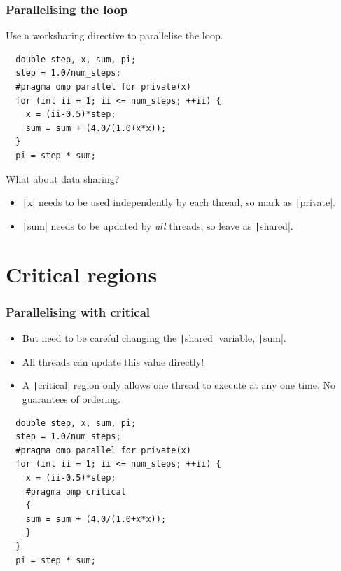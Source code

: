 \documentclass{beamer}
\begin{document}
\begin{frame}[fragile]
\frametitle{Parallelising the loop}

Use a worksharing directive to parallelise the loop.

\begin{verbatim}
  double step, x, sum, pi;
  step = 1.0/num_steps;
  #pragma omp parallel for private(x)
  for (int ii = 1; ii <= num_steps; ++ii) {
    x = (ii-0.5)*step;
    sum = sum + (4.0/(1.0+x*x));
  }
  pi = step * sum;
\end{verbatim}

\vfill

What about data sharing?
\begin{itemize}
  \item \texttt|x| needs to be used independently by each thread, so mark as \texttt|private|.
  \item \texttt|sum| needs to be updated by \emph{all} threads, so leave as \texttt|shared|.
\end{itemize}

\end{frame}

\section{Critical regions}
\begin{frame}[fragile]
\frametitle{Parallelising with critical}
\begin{itemize}
  \item But need to be careful changing the \texttt|shared| variable, \texttt|sum|.
  \item All threads can update this value directly!
  \item A \texttt|critical| region only allows one thread to execute at any one time. No guarantees of ordering.
\end{itemize}

\begin{verbatim}
  double step, x, sum, pi;
  step = 1.0/num_steps;
  #pragma omp parallel for private(x)
  for (int ii = 1; ii <= num_steps; ++ii) {
    x = (ii-0.5)*step;
    #pragma omp critical
    {
    sum = sum + (4.0/(1.0+x*x));
    }
  }
  pi = step * sum;
\end{verbatim}

\end{frame}
\end{document}
